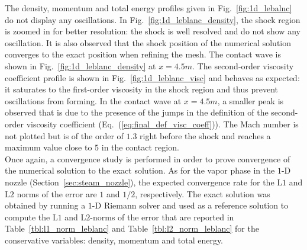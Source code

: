 \documentclass[preprint,10pt]{elsarticle}
\newcommand{\eqt}[1]{Eq.~(\ref{#1})}                     %
\newcommand{\fig}[1]{Fig.~\ref{#1}}                      %
\newcommand{\tbl}[1]{Table~\ref{#1}}                     %
\newcommand{\sct}[1]{Section~\ref{#1}}                   %
\begin{document}
 The density, momentum and total energy profiles given in \fig{fig:1d_lebalnc} do not display any oscillations. In \fig{fig:1d_leblanc_density}, the shock region is zoomed in for better resolution: the shock is well resolved and do not show any oscillation. It is also observed that the shock position of the numerical solution converges to the exact position when refining the mesh. The contact wave is shown in \fig{fig:1d_leblanc_density} at $x=4.5m$. The second-order viscosity coefficient profile is shown in \fig{fig:1d_leblanc_visc} and behaves as expected: it saturates to the first-order viscosity in the shock region and thus prevent oscillations from forming. In the contact wave at $x=4.5m$, a smaller peak is observed that is due to the presence of the jumps in the definition of the second-order viscosity coefficient (\eqt{eq:final_def_visc_coeff}).  The Mach number is not plotted but is of the order of $1.3$ right before the shock and reaches a maximum value close to $5$ in the contact region.\\
Once again, a convergence study is performed in order to prove convergence of the numerical solution to the exact solution. As for the vapor phase in the $1$-D nozzle (\sct{sec:steam_nozzle}), the expected convergence rate for the L$1$ and L$2$ norms of the error are $1$ and $1/2$, respectively. The exact solution was obtained by running a $1$-D Riemann solver and used as a reference solution to compute the L$1$ and L$2$-norms of the error that are reported in \tbl{tbl:l1_norm_leblanc} and \tbl{tbl:l2_norm_leblanc} for the conservative variables: density, momentum and total energy.
\end{document}
